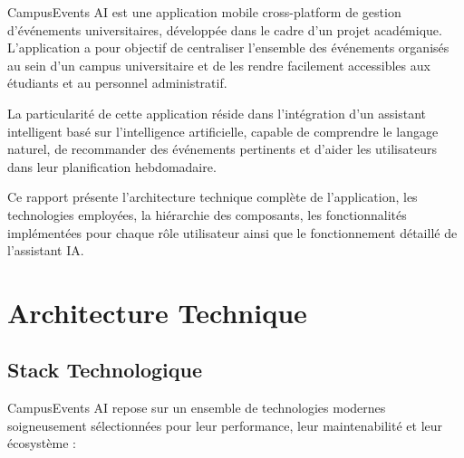 \documentclass[a4paper,12pt]{report}
\begin{document}
CampusEvents AI est une application mobile cross-platform de gestion d'\'{e}v\'{e}nements universitaires, d\'{e}velopp\'{e}e dans le cadre d'un projet acad\'{e}mique. L'application a pour objectif de centraliser l'ensemble des \'{e}v\'{e}nements organis\'{e}s au sein d'un campus universitaire et de les rendre facilement accessibles aux \'{e}tudiants et au personnel administratif.

La particularit\'{e} de cette application r\'{e}side dans l'int\'{e}gration d'un assistant intelligent bas\'{e} sur l'intelligence artificielle, capable de comprendre le langage naturel, de recommander des \'{e}v\'{e}nements pertinents et d'aider les utilisateurs dans leur planification hebdomadaire.

Ce rapport pr\'{e}sente l'architecture technique compl\`{e}te de l'application, les technologies employ\'{e}es, la hi\'{e}rarchie des composants, les fonctionnalit\'{e}s impl\'{e}ment\'{e}es pour chaque r\^{o}le utilisateur ainsi que le fonctionnement d\'{e}taill\'{e} de l'assistant IA.

\newpage

\chapter{Architecture Technique}

\section{Stack Technologique}

CampusEvents AI repose sur un ensemble de technologies modernes soigneusement s\'{e}lectionn\'{e}es pour leur performance, leur maintenabilit\'{e} et leur \'{e}cosyst\`{e}me :
\end{document}
